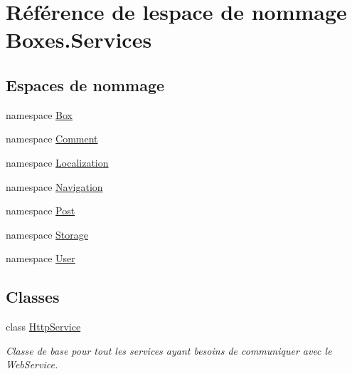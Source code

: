 \hypertarget{namespace_boxes_1_1_services}{}\section{Référence de l\textquotesingle{}espace de nommage Boxes.\+Services}
\label{namespace_boxes_1_1_services}
\subsection*{Espaces de nommage}
\begin{DoxyCompactItemize}
\item 
namespace \hyperlink{namespace_boxes_1_1_services_1_1_box}{Box}
\item 
namespace \hyperlink{namespace_boxes_1_1_services_1_1_comment}{Comment}
\item 
namespace \hyperlink{namespace_boxes_1_1_services_1_1_localization}{Localization}
\item 
namespace \hyperlink{namespace_boxes_1_1_services_1_1_navigation}{Navigation}
\item 
namespace \hyperlink{namespace_boxes_1_1_services_1_1_post}{Post}
\item 
namespace \hyperlink{namespace_boxes_1_1_services_1_1_storage}{Storage}
\item 
namespace \hyperlink{namespace_boxes_1_1_services_1_1_user}{User}
\end{DoxyCompactItemize}
\subsection*{Classes}
\begin{DoxyCompactItemize}
\item 
class \hyperlink{class_boxes_1_1_services_1_1_http_service}{Http\+Service}
\begin{DoxyCompactList}\small\item\em Classe de base pour tout les services ayant besoins de communiquer avec le Web\+Service. \end{DoxyCompactList}\end{DoxyCompactItemize}

